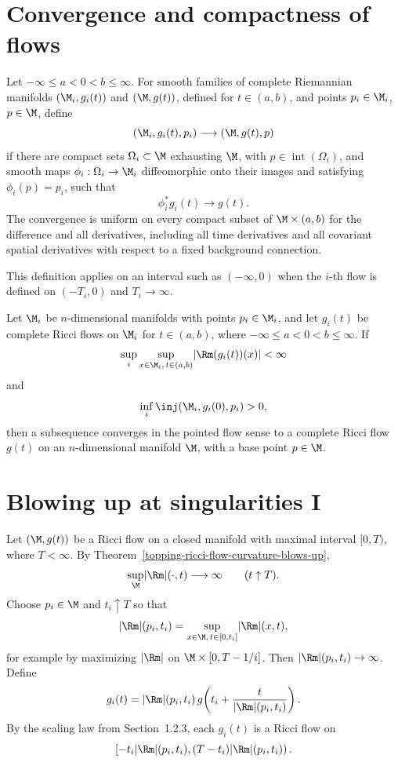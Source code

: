 \section{Convergence and compactness of flows}

\begin{definition}
\label{topping-ch7-flow-convergence}
Let $-\infty\leq a<0<b\leq\infty$. For smooth families of complete
Riemannian manifolds $(\M_i,g_i(t))$ and $(\M,g(t))$, defined for
$t\in(a,b)$, and points $p_i\in\M_i$, $p\in\M$, define
\[
(\M_i,g_i(t),p_i)\longrightarrow(\M,g(t),p)
\]
if there are compact sets $\Omega_i\subset\M$ exhausting $\M$, with
$p\in\operatorname{int}(\Omega_i)$, and smooth maps
$\phi_i:\Omega_i\to\M_i$ diffeomorphic onto their images and satisfying
$\phi_i(p)=p_i$, such that
\[
\phi_i^*g_i(t)\longrightarrow g(t).
\]
The convergence is uniform on every compact subset of $\M\times(a,b)$ for
the difference and all derivatives, including all time derivatives and all
covariant spatial derivatives with respect to a fixed background connection.
\end{definition}

\begin{remark}
\label{topping-ch7-flow-backward-interval}
This definition applies on an interval such as $(-\infty,0)$ when the
$i$-th flow is defined on $(-T_i,0)$ and $T_i\to\infty$.
\end{remark}

\begin{theorem}
\label{topping-ch7-compactness-ricci-flows}
Let $\M_i$ be $n$-dimensional manifolds with points $p_i\in\M_i$, and let
$g_i(t)$ be complete Ricci flows on $\M_i$ for
$t\in(a,b)$, where $-\infty\leq a<0<b\leq\infty$. If
\[
\sup_i\sup_{x\in\M_i,\,t\in(a,b)}\lvert\Rm(g_i(t))(x)\rvert<\infty
\]
and
\[
\inf_i\inj(\M_i,g_i(0),p_i)>0,
\]
then a subsequence converges in the pointed flow sense to a complete Ricci
flow $g(t)$ on an $n$-dimensional manifold $\M$, with a base point $p\in\M$.
\end{theorem}

\section{Blowing up at singularities I}

Let $(\M,g(t))$ be a Ricci flow on a closed manifold with maximal interval
$[0,T)$, where $T<\infty$. By Theorem~\ref{topping-ricci-flow-curvature-blows-up},
\[
\sup_{\M}\lvert\Rm\rvert(\cdot,t)\longrightarrow\infty
\qquad (t\uparrow T).
\]
Choose $p_i\in\M$ and $t_i\uparrow T$ so that
\[
\lvert\Rm\rvert(p_i,t_i)
=\sup_{x\in\M,\,t\in[0,t_i]}\lvert\Rm\rvert(x,t),
\]
for example by maximizing $\lvert\Rm\rvert$ on
$\M\times[0,T-1/i]$. Then
$\lvert\Rm\rvert(p_i,t_i)\to\infty$. Define
\[
g_i(t)=\lvert\Rm\rvert(p_i,t_i)\,
g\!\left(t_i+\frac{t}{\lvert\Rm\rvert(p_i,t_i)}\right).
\]
By the scaling law from Section~1.2.3, each $g_i(t)$ is a Ricci flow on
\[
\left[-t_i\lvert\Rm\rvert(p_i,t_i),
(T-t_i)\lvert\Rm\rvert(p_i,t_i)\right).
\]

